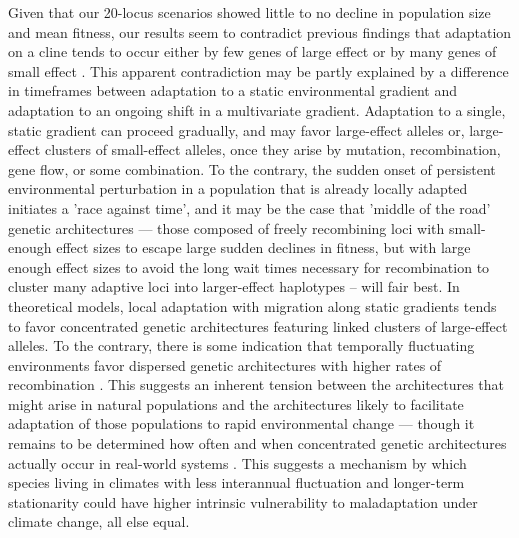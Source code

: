\documentclass[9pt,twocolumn,twoside,lineno]{pnas-new}
\begin{document}
Given that our 20-locus scenarios showed little to no decline in population size and mean fitness, our results seem to contradict previous findings that adaptation on a cline tends to occur either by few genes of large effect or by many genes of small effect \cite{yeaman_amnat}. This apparent contradiction may be partly explained by a difference in timeframes between adaptation to a static environmental gradient and adaptation to an ongoing shift in a multivariate gradient. Adaptation to a single, static gradient can proceed gradually, and may favor large-effect alleles or, large-effect clusters of small-effect alleles, once they arise by mutation, recombination, gene flow, or some combination. To the contrary, the sudden onset of persistent environmental perturbation in a population that is already locally adapted initiates a 'race against time', and it may be the case that 'middle of the road' genetic architectures --- those composed of freely recombining loci with small-enough effect sizes to escape large sudden declines in fitness, but with large enough effect sizes to avoid the long wait times necessary for recombination to cluster many adaptive loci into larger-effect haplotypes  -- will fair best. In theoretical models, local adaptation with migration along static gradients tends to favor concentrated genetic architectures featuring linked clusters of large-effect alleles. To the contrary, there is some indication that temporally fluctuating environments favor dispersed genetic architectures with higher rates of recombination \cite{burger,kondrashov,yeaman_review,yeaman_whitlock}. This suggests an inherent tension between the architectures that might arise in natural populations and the architectures likely to facilitate adaptation of those populations to rapid environmental change --- though it remains to be determined how often and when concentrated genetic architectures actually occur in real-world systems \cite{laruson}.  This suggests a mechanism by which species living in climates with less interannual fluctuation and longer-term stationarity could have higher intrinsic vulnerability to maladaptation under climate change, all else equal.
   
\end{document}
